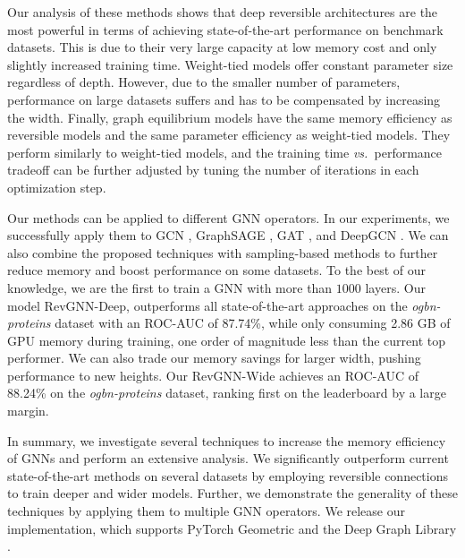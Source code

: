 \documentclass{article}
\newcommand{\vs}{\emph{vs.~}}
\begin{document}
Our analysis of these methods shows that deep reversible architectures are the most powerful in terms of achieving state-of-the-art performance on benchmark datasets. This is due to their very large capacity at low memory cost and only slightly increased training time. 
Weight-tied models offer constant parameter size regardless of depth.
However, due to the smaller number of parameters, performance on large datasets suffers and has to be compensated by increasing the width. Finally, graph equilibrium models have the same memory efficiency as reversible models and the same parameter efficiency as weight-tied models. They perform similarly to weight-tied models, and the training time \vs performance tradeoff can be further adjusted by tuning the number of iterations in each optimization step.

Our methods can be applied to different GNN operators. In our experiments, we successfully apply them to GCN \citep{kipf2017semi}, GraphSAGE \citep{hamilton2017inductive}, GAT \citep{veli2018gat}, and DeepGCN \citep{li2019deepgcns}. We can also combine the proposed techniques with sampling-based methods to further reduce memory and boost performance on some datasets.
To the best of our knowledge, we are the first to train a GNN with more than $1000$ layers. Our model RevGNN-Deep, outperforms all state-of-the-art approaches on the \emph{ogbn-proteins} dataset \citep{hu2020open} with an ROC-AUC of 87.74\%, while only consuming 2.86 GB of GPU memory during training, one order of magnitude less than the current top performer. We can also trade our memory savings for larger width, pushing performance to new heights. Our RevGNN-Wide achieves an ROC-AUC of 88.24\% on the \emph{ogbn-proteins} dataset, ranking first on the leaderboard by a large margin. 

In summary, we investigate several techniques to increase the memory efficiency of GNNs and perform an extensive analysis. We significantly outperform current state-of-the-art methods on several datasets by employing reversible connections to train deeper and wider models. Further, we demonstrate the generality of these techniques by applying them to multiple GNN operators. We release our implementation, which supports PyTorch Geometric \citep{Fey/Lenssen/2019} and the Deep Graph Library 
\citep{wang2019dgl}.
\end{document}
